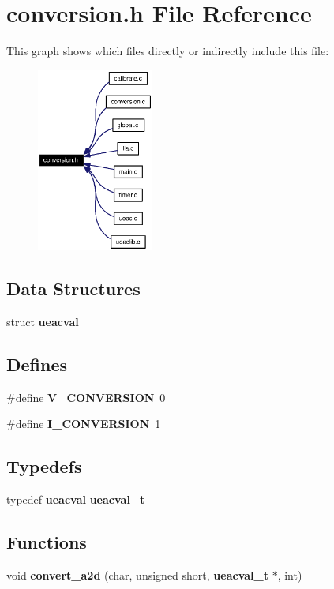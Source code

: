 \section{conversion.h File Reference}
\label{conversion_8h}


This graph shows which files directly or indirectly include this file:\begin{figure}[H]
\begin{center}
\leavevmode
\includegraphics[width=109pt]{conversion_8h__dep__incl}
\end{center}
\end{figure}
\subsection*{Data Structures}
\begin{CompactItemize}
\item 
struct {\bf ueacval}
\end{CompactItemize}
\subsection*{Defines}
\begin{CompactItemize}
\item 
\#define {\bf V\_\-CONVERSION}~0
\item 
\#define {\bf I\_\-CONVERSION}~1
\end{CompactItemize}
\subsection*{Typedefs}
\begin{CompactItemize}
\item 
typedef {\bf ueacval} {\bf ueacval\_\-t}
\end{CompactItemize}
\subsection*{Functions}
\begin{CompactItemize}
\item 
void {\bf convert\_\-a2d} (char, unsigned short, {\bf ueacval\_\-t} $\ast$, int)
\end{CompactItemize}


